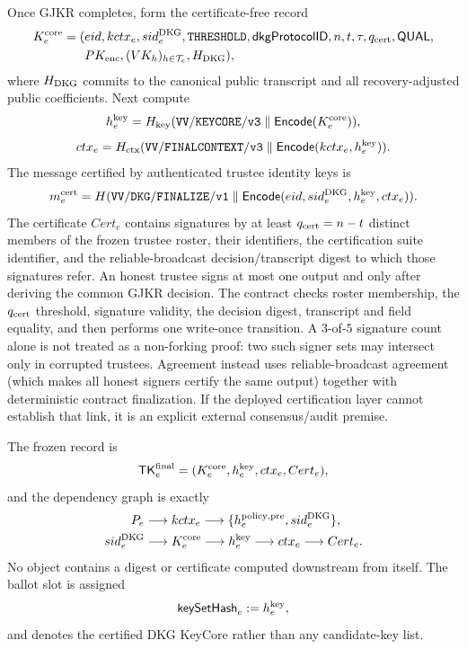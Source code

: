 \documentclass[pdflatex,sn-mathphys-num]{sn-jnl}%
\theoremstyle{thmstyleone}%
\theoremstyle{thmstyletwo}%
\theoremstyle{thmstylethree}%
\begin{document}
Once GJKR completes, form the certificate-free record
\[
\begin{aligned}
 K_e^{\rm core}=(&eid,kctx_e,sid_e^{\rm DKG},\mathtt{THRESHOLD},
 \mathsf{dkgProtocolID},n,t,\tau,q_{\rm cert},\mathsf{QUAL},\\
 &PK_{\rm enc},(VK_h)_{h\in\mathcal T_e},H_{\rm DKG}),
\end{aligned}
\]
where $H_{\rm DKG}$ commits to the canonical public transcript and all
recovery-adjusted public coefficients.  Next compute
\[
 h_e^{\rm key}=H_{\rm key}(\mathtt{VV/KEYCORE/v3}\parallel
                           \mathsf{Encode}(K_e^{\rm core})),
\]
\[
 ctx_e=H_{\rm ctx}(\mathtt{VV/FINALCONTEXT/v3}\parallel
                   \mathsf{Encode}(kctx_e,h_e^{\rm key})).
\]
The message certified by authenticated trustee identity keys is
\[
 m_e^{\rm cert}=H(\mathtt{VV/DKG/FINALIZE/v1}\parallel
  \mathsf{Encode}(eid,sid_e^{\rm DKG},h_e^{\rm key},ctx_e)).
\]
The certificate $Cert_e$ contains signatures by at least
$q_{\rm cert}=n-t$ distinct
members of the frozen trustee roster, their identifiers, the certification
suite identifier, and the reliable-broadcast decision/transcript digest to
which those signatures refer.  An honest trustee signs at most one output and
only after deriving the common GJKR decision.  The contract checks roster
membership, the $q_{\rm cert}$ threshold, signature validity, the decision digest,
transcript and field equality, and then performs one write-once transition.  A
$3$-of-$5$ signature count alone is not treated as a non-forking proof: two
such signer sets may intersect only in corrupted trustees.  Agreement instead
uses reliable-broadcast agreement (which makes all honest signers certify the
same output) together with deterministic contract finalization.  If the
deployed certification layer cannot establish that link, it is an explicit
external consensus/audit premise.

The frozen record is
\[
 \mathsf{TK}_e^{\rm final}=
 (K_e^{\rm core},h_e^{\rm key},ctx_e,Cert_e),
\]
and the dependency graph is exactly
\[
\begin{aligned}
 P_e&\longrightarrow kctx_e
 \longrightarrow\{h_e^{\rm policy,pre},sid_e^{\rm DKG}\},\\
 sid_e^{\rm DKG}&\longrightarrow K_e^{\rm core}
 \longrightarrow h_e^{\rm key}\longrightarrow ctx_e
 \longrightarrow Cert_e.
\end{aligned}
\]
No object contains a digest or certificate computed downstream from itself.
The ballot slot is assigned
\[
 \mathsf{keySetHash}_e:=h_e^{\rm key},
\]
and denotes the certified DKG KeyCore rather than any candidate-key list.
\end{document}
